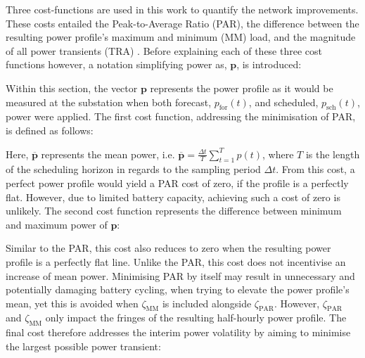 Three cost-functions are used in this work to quantify the network improvements.
These costs entailed the Peak-to-Average Ratio (PAR), the difference between the resulting power profile's maximum and minimum (MM) load, and the magnitude of all power transients (TRA) \cite{Mohsenian-Rad2010, Mostafa2016}.
Before explaining each of these three cost functions however, a notation simplifying power as, $\textbf{p}$, is introduced:



Within this section, the vector $\textbf{p}$ represents the power profile as it would be measured at the substation when both forecast, $p_\text{for}(t)$, and scheduled, $p_\text{sch}(t)$, power were applied.
The first cost function, addressing the minimisation of PAR, is defined as follows:



Here, $\overline{\textbf{p}}$ represents the mean power, i.e. $\overline{\textbf{p}} = \frac{\Delta t}{T}\sum_{t=1}^Tp(t)$, where $T$ is the length of the scheduling horizon in regards to the sampling period $\Delta t$.
From this cost, a perfect power profile would yield a PAR cost of zero, if the profile is a perfectly flat.
However, due to limited battery capacity, achieving such a cost of zero is unlikely.
The second cost function represents the difference between minimum and maximum power of $\textbf{p}$:



Similar to the PAR, this cost also reduces to zero when the resulting power profile is a perfectly flat line.
Unlike the PAR, this cost does not incentivise an increase of mean power.
Minimising PAR by itself may result in unnecessary and potentially damaging battery cycling, when trying to elevate the power profile's mean, yet this is avoided when $\zeta_\text{MM}$ is included alongside $\zeta_\text{PAR}$.
However, $\zeta_\text{PAR}$ and $\zeta_\text{MM}$ only impact the fringes of the resulting half-hourly power profile.
The final cost therefore addresses the interim power volatility by aiming to minimise the largest possible power transient:



